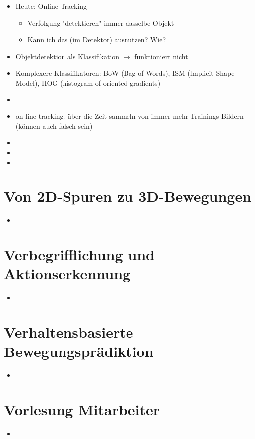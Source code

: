 \documentclass{report}
\begin{document}
	\begin{itemize}
		\item Heute: Online-Tracking
		\begin{itemize}
			\item Verfolgung "detektieren" immer dasselbe Objekt
			\item Kann ich das (im Detektor) ausnutzen? Wie?
		\end{itemize}
		
		\item Objektdetektion als Klassifikation $\rightarrow$ funktioniert nicht
		\item Komplexere Klassifikatoren:
		\newline BoW (Bag of Words), ISM (Implicit Shape Model), HOG (histogram of oriented gradients)
		\item 
		\item on-line tracking: über die Zeit sammeln von immer mehr Trainings Bildern (können auch falsch sein)
		\item 
		\item 
		\item 
	\end{itemize}
	
	
	\section{Von 2D-Spuren zu 3D-Bewegungen}
	
	\begin{itemize}
		\item 
	\end{itemize}
	
	
	\section{Verbegrifflichung und Aktionserkennung}
	
	\begin{itemize}
		\item 
	\end{itemize}
	
	
	\section{Verhaltensbasierte Bewegungsprädiktion}
	
	\begin{itemize}
		\item 
	\end{itemize}
	
	
	\section{Vorlesung Mitarbeiter}
	
	\begin{itemize}
		\item 
	\end{itemize}
	
	
\end{document}
